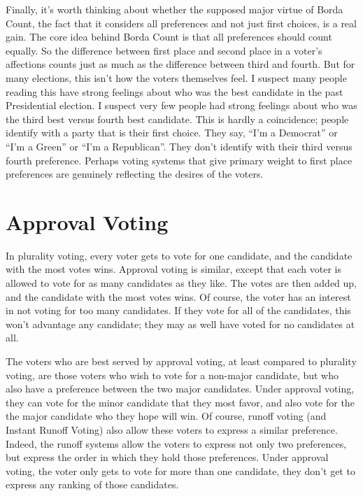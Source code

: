 \begin{multicols}{2}
Finally, it's worth thinking about whether the supposed major virtue of Borda Count, the fact that it considers all preferences and not just first choices, is a real gain. The core idea behind Borda Count is that all preferences should count equally. So the difference between first place and second place in a voter's affections counts just as much as the difference between third and fourth. But for many elections, this isn't how the voters themselves feel. I suspect many people reading this have strong feelings about who was the best candidate in the past Presidential election. I suspect very few people had strong feelings about who was the third best versus fourth best candidate. This is hardly a coincidence; people identify with a party that is their first choice. They say, ``I'm a Democrat'' or ``I'm a Green'' or ``I'm a Republican''. They don't identify with their third versus fourth preference. Perhaps voting systems that give primary weight to first place preferences are genuinely reflecting the desires of the voters. 

\section{Approval Voting}
In plurality voting, every voter gets to vote for one candidate, and the candidate with the most votes wins. Approval voting is similar, except that each voter is allowed to vote for as many candidates as they like. The votes are then added up, and the candidate with the most votes wins. Of course, the voter has an interest in not voting for too many candidates. If they vote for all of the candidates, this won't advantage any candidate; they may as well have voted for no candidates at all.

The voters who are best served by approval voting, at least compared to plurality voting, are those voters who wish to vote for a non-major candidate, but who also have a preference between the two major candidates. Under approval voting, they can vote for the minor candidate that they most favor, and also vote for the the major candidate who they hope will win. Of course, runoff voting (and Instant Runoff Voting) also allow these voters to express a similar preference. Indeed, the runoff systems allow the voters to express not only two preferences, but express the order in which they hold those preferences. Under approval voting, the voter only gets to vote for more than one candidate, they don't get to express any ranking of those candidates.


\end{multicols}
